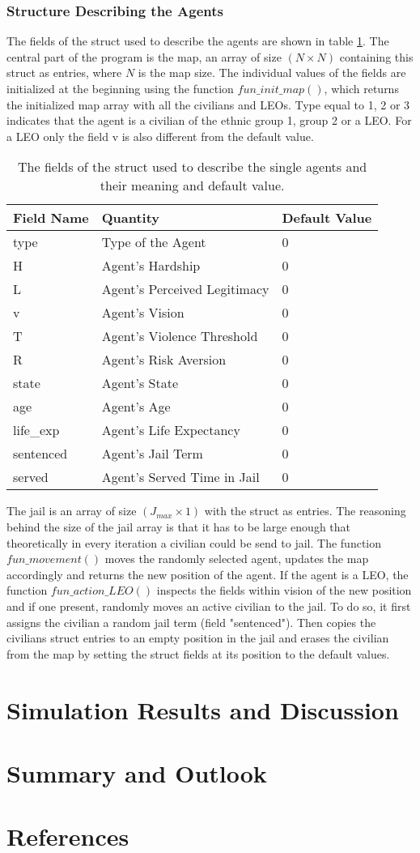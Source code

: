 \documentclass[11pt]{article}
\begin{document}
\subsubsection{Structure Describing the Agents}
The fields of the struct used to describe the agents are shown in table \ref{tab:fields_struct}. The central part of the program is the map, an array of size $(N \times N)$ containing this struct as entries, where $N$ is the map size. The individual values of the fields are initialized at the beginning using the function $fun\_init\_map()$, which returns the initialized map array with all the civilians and LEOs. Type equal to 1, 2 or 3 indicates that the agent is a civilian of the ethnic group 1, group 2 or a LEO. For a LEO only the field v is also different from the default value.
\begin{table}[!htbp]
	\centering
	\caption{The fields of the struct used to describe the single agents and their meaning and default value.}
	\vspace{0.5 cm}
		\begin{tabular}{l | l | l} 
			Field Name & Quantity & Default Value\\
			\hline
			type & Type of the Agent & 0\\
			H & Agent's Hardship & 0\\
			L & Agent's Perceived Legitimacy & 0\\
			v & Agent's Vision & 0\\
			T & Agent's Violence Threshold & 0\\
			R & Agent's Risk Aversion & 0\\
			state & Agent's State & 0\\
			age & Agent's Age & 0\\
			life\_exp & Agent's Life Expectancy & 0\\
			sentenced & Agent's Jail Term & 0\\
			served & Agent's Served Time in Jail & 0
	\end{tabular}
	\label{tab:fields_struct}
\end{table}
The jail is an array of size $(J_{max} \times 1)$ with the struct as entries. The reasoning behind the size of the jail array is that it has to be large enough that theoretically in every iteration a civilian could be send to jail. The function $fun\_movement()$ moves the randomly selected agent, updates the map accordingly and returns the new position of the agent. If the agent is a LEO, the function $fun\_action\_LEO()$ inspects the fields within vision of the new position and if one present, randomly moves an active civilian to the jail. To do so, it first assigns the civilian a random jail term (field "sentenced"). Then copies the civilians struct entries to an empty position in the jail and erases the civilian from the map by setting the struct fields at its position to the default values.

\section{Simulation Results and Discussion}

\section{Summary and Outlook}

\section{References}
\end{document}
